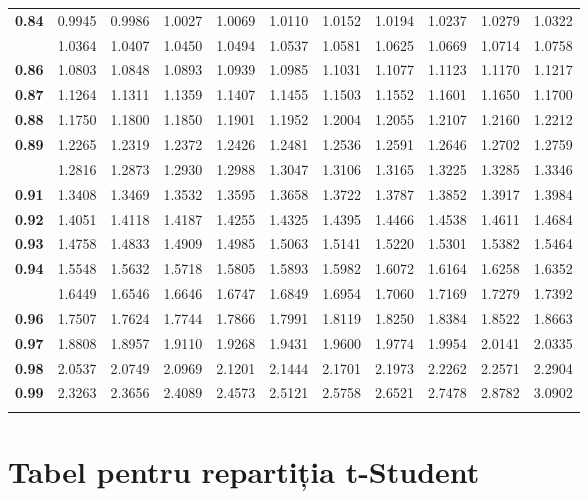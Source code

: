 \documentclass[]{article}
\begin{document}
\begin{longtable}{>{\bfseries}r|rrrrrrrrrr}
0.84 & 0.9945 & 0.9986 & 1.0027 & 1.0069 & 1.0110 & 1.0152 & 1.0194 & 1.0237 & 1.0279 & 1.0322\\
\addlinespace
0.85 & 1.0364 & 1.0407 & 1.0450 & 1.0494 & 1.0537 & 1.0581 & 1.0625 & 1.0669 & 1.0714 & 1.0758\\
0.86 & 1.0803 & 1.0848 & 1.0893 & 1.0939 & 1.0985 & 1.1031 & 1.1077 & 1.1123 & 1.1170 & 1.1217\\
0.87 & 1.1264 & 1.1311 & 1.1359 & 1.1407 & 1.1455 & 1.1503 & 1.1552 & 1.1601 & 1.1650 & 1.1700\\
0.88 & 1.1750 & 1.1800 & 1.1850 & 1.1901 & 1.1952 & 1.2004 & 1.2055 & 1.2107 & 1.2160 & 1.2212\\
0.89 & 1.2265 & 1.2319 & 1.2372 & 1.2426 & 1.2481 & 1.2536 & 1.2591 & 1.2646 & 1.2702 & 1.2759\\
\addlinespace
0.90 & 1.2816 & 1.2873 & 1.2930 & 1.2988 & 1.3047 & 1.3106 & 1.3165 & 1.3225 & 1.3285 & 1.3346\\
0.91 & 1.3408 & 1.3469 & 1.3532 & 1.3595 & 1.3658 & 1.3722 & 1.3787 & 1.3852 & 1.3917 & 1.3984\\
0.92 & 1.4051 & 1.4118 & 1.4187 & 1.4255 & 1.4325 & 1.4395 & 1.4466 & 1.4538 & 1.4611 & 1.4684\\
0.93 & 1.4758 & 1.4833 & 1.4909 & 1.4985 & 1.5063 & 1.5141 & 1.5220 & 1.5301 & 1.5382 & 1.5464\\
0.94 & 1.5548 & 1.5632 & 1.5718 & 1.5805 & 1.5893 & 1.5982 & 1.6072 & 1.6164 & 1.6258 & 1.6352\\
\addlinespace
0.95 & 1.6449 & 1.6546 & 1.6646 & 1.6747 & 1.6849 & 1.6954 & 1.7060 & 1.7169 & 1.7279 & 1.7392\\
0.96 & 1.7507 & 1.7624 & 1.7744 & 1.7866 & 1.7991 & 1.8119 & 1.8250 & 1.8384 & 1.8522 & 1.8663\\
0.97 & 1.8808 & 1.8957 & 1.9110 & 1.9268 & 1.9431 & 1.9600 & 1.9774 & 1.9954 & 2.0141 & 2.0335\\
0.98 & 2.0537 & 2.0749 & 2.0969 & 2.1201 & 2.1444 & 2.1701 & 2.1973 & 2.2262 & 2.2571 & 2.2904\\
0.99 & 2.3263 & 2.3656 & 2.4089 & 2.4573 & 2.5121 & 2.5758 & 2.6521 & 2.7478 & 2.8782 & 3.0902\\*
\end{longtable}

\endgroup{}

\section{Tabel pentru repartiția
t-Student}\label{tabel-pentru-repartitia-t-student}
\end{document}
